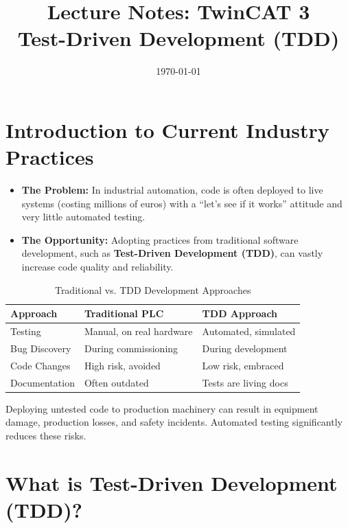 \documentclass[11pt,a4paper]{article}
\title{
    \vspace{-1cm}
    \textbf{Lecture Notes: TwinCAT 3}\\
    \Large Test-Driven Development (TDD)
}
\author{}
\date{\today}
\begin{document}
\maketitle

\tableofcontents
\newpage

\section{Introduction to Current Industry Practices}

\begin{itemize}[leftmargin=*]
    \item \textbf{The Problem:} In industrial automation, code is often deployed to live systems (costing millions of euros) with a ``let's see if it works'' attitude and very little automated testing.
    \item \textbf{The Opportunity:} Adopting practices from traditional software development, such as \textbf{Test-Driven Development (TDD)}, can vastly increase code quality and reliability.
\end{itemize}

\begin{table}[h]
\centering
\begin{tabular}{@{}lll@{}}
\toprule
\textbf{Approach} & \textbf{Traditional PLC} & \textbf{TDD Approach} \\
\midrule
Testing & Manual, on real hardware & Automated, simulated \\
Bug Discovery & During commissioning & During development \\
Code Changes & High risk, avoided & Low risk, embraced \\
Documentation & Often outdated & Tests are living docs \\
\bottomrule
\end{tabular}
\caption{Traditional vs. TDD Development Approaches}
\end{table}

\begin{warningbox}
Deploying untested code to production machinery can result in equipment damage, production losses, and safety incidents. Automated testing significantly reduces these risks.
\end{warningbox}

\section{What is Test-Driven Development (TDD)?}
\end{document}
